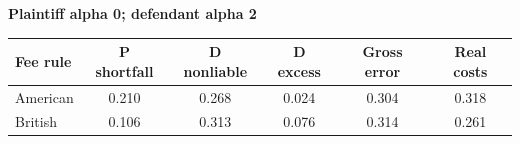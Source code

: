 \documentclass[10pt,border=5pt,varwidth=17cm]{standalone}
\begin{document}
\begingroup
\small
\setlength{\tabcolsep}{5pt}
\renewcommand{\arraystretch}{1.20}
\noindent\textbf{Plaintiff alpha 0; defendant alpha 2}\par\smallskip
\noindent\begin{tabularx}{\linewidth}{@{}>{\raggedright\arraybackslash}Xccccc@{}}
\toprule
\textbf{Fee rule} & \textbf{P shortfall} & \textbf{D nonliable} & \textbf{D excess} & \textbf{Gross error} & \textbf{Real costs} \\
\midrule
American & 0.210 & 0.268 & 0.024 & 0.304 & 0.318 \\
British & 0.106 & 0.313 & 0.076 & 0.314 & 0.261 \\
\bottomrule\end{tabularx}\par\medskip
\endgroup
\end{document}
